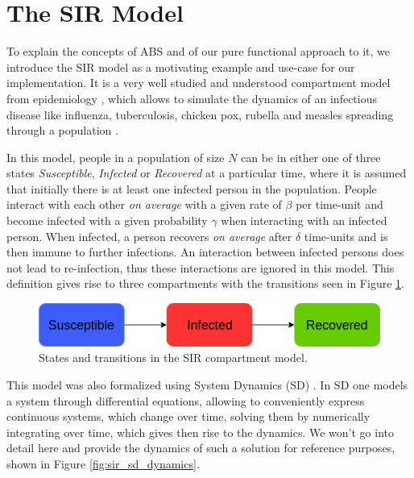 \section{The SIR Model}
\label{sec:sir_model}
To explain the concepts of ABS and of our pure functional approach to it, we introduce the SIR model as a motivating example and use-case for our implementation. It is a very well studied and understood compartment model from epidemiology \cite{kermack_contribution_1927}, which allows to simulate the dynamics of an infectious disease like influenza, tuberculosis, chicken pox, rubella and measles spreading through a population \cite{enns_its_2010}.

In this model, people in a population of size $N$ can be in either one of three states \textit{Susceptible}, \textit{Infected} or \textit{Recovered} at a particular time, where it is assumed that initially there is at least one infected person in the population. People interact with each other \textit{on average} with a given rate of $\beta$ per time-unit and become infected with a given probability $\gamma$ when interacting with an infected person. When infected, a person recovers \textit{on average} after $\delta$ time-units and is then immune to further infections. An interaction between infected persons does not lead to re-infection, thus these interactions are ignored in this model. This definition gives rise to three compartments with the transitions seen in Figure \ref{fig:sir_transitions}.

\begin{figure}
	\centering
	\includegraphics[width=.4\textwidth, angle=0]{./fig/diagrams/SIR_transitions.png}
	\caption{States and transitions in the SIR compartment model.}
	\label{fig:sir_transitions}
\end{figure}

This model was also formalized using System Dynamics (SD) \cite{porter_industrial_1962}. In SD one models a system through differential equations, allowing to conveniently express continuous systems, which change over time, solving them by numerically integrating over time, which gives then rise to the dynamics. We won't go into detail here and provide the dynamics of such a solution for reference purposes, shown in Figure \ref{fig:sir_sd_dynamics}.

